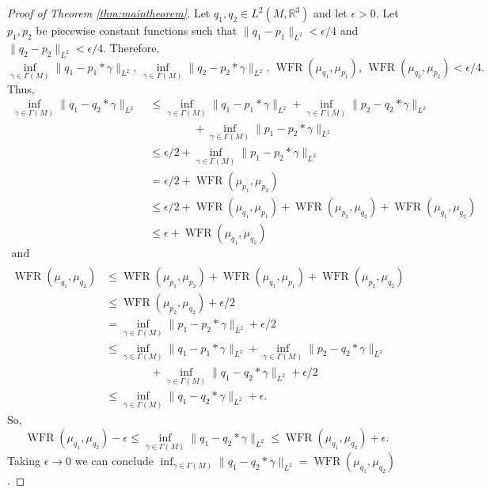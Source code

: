 \documentclass[final,hidelinks,onefignum,onetabnum]{siamart220329}
\newcommand{\R}{\mathbb{R}}
\newcommand{\WFR}{\operatorname{WFR}}
\begin{document}
\begin{proof}[Proof of Theorem \ref{thm:maintheorem}]

Let $q_1,q_2\in L^2(M,\R^3)$ and let $\epsilon>0$. Let $p_1,p_2$ be piecewise constant functions such that $\|q_1-p_1\|_{L^2}<\epsilon/4$ and $\|q_2-p_2\|_{L^2}<\epsilon/4$.  Therefore,   \[\inf_{\gamma\in \Gamma(M)}\|q_1-p_1*\gamma\|_{L^2},\,\inf_{\gamma\in \Gamma(M)}\|q_2-p_2*\gamma\|_{L^2},\,  \WFR(\mu_{q_1},\mu_{p_1}),\,\WFR(\mu_{q_2},\mu_{p_2})<\epsilon/4.\]
Thus,
\begin{align*}
    \inf_{\gamma\in \Gamma(M)}\|q_1-q_2*\gamma\|_{L^2}&\leq \inf_{\gamma\in \Gamma(M)}\|q_1-p_1*\gamma\|_{L^2}+\inf_{\gamma\in \Gamma(M)}\|p_2-q_2*\gamma\|_{L^2}\\
    &\qquad\qquad+\inf_{\gamma\in\Gamma(M)}\|p_1-p_2*\gamma\|_{L^2}\\
    &\leq\epsilon/2+\inf_{\gamma\in\Gamma(M)}\|p_1-p_2*\gamma\|_{L^2}\\
    &=\epsilon/2+\WFR(\mu_{p_1},\mu_{p_2})\\
    &\leq \epsilon/2 + \WFR(\mu_{q_1},\mu_{p_1}) + \WFR(\mu_{p_2},\mu_{q_2})+ \WFR(\mu_{q_1},\mu_{q_2})\\
    &\leq \epsilon + \WFR(\mu_{q_1},\mu_{q_2})\\     
    \text{and}\qquad\qquad\qquad\qquad\qquad\\
\end{align*}
\begin{align*}    \WFR(\mu_{q_1},\mu_{q_2})
    &\leq\WFR(\mu_{p_1},\mu_{p_2})+\WFR(\mu_{q_1},\mu_{p_1})+\WFR(\mu_{p_2},\mu_{q_2})\\
    &\leq\WFR(\mu_{p_2},\mu_{q_2})+\epsilon/2\\
    &=\inf_{\gamma\in\Gamma(M)}\|p_1-p_2*\gamma\|_{L^2}+\epsilon/2\\
    &\leq  \inf_{\gamma\in \Gamma(M)}\|q_1-p_1*\gamma\|_{L^2}+\inf_{\gamma\in \Gamma(M)}\|p_2-q_2*\gamma\|_{L^2}\\
    &\qquad\qquad+\inf_{\gamma\in\Gamma(M)}\|q_1-q_2*\gamma\|_{L^2}+\epsilon/2\\
    &\leq \inf_{\gamma\in\Gamma(M)}\|q_1-q_2*\gamma\|_{L^2}+\epsilon.
\end{align*}
So,\begin{equation*}
    \WFR(\mu_{q_1},\mu_{q_2})-\epsilon\leq \inf_{\gamma\in\Gamma(M)}\|q_1-q_2*\gamma\|_{L^2} \leq \WFR(\mu_{q_1},\mu_{q_2})+\epsilon.
\end{equation*}
Taking $\epsilon\to 0$ we can conclude $\inf_{\gamma\in\Gamma(M)}\|q_1-q_2*\gamma\|_{L^2}=\WFR(\mu_{q_1},\mu_{q_2})$.
\end{proof}
\end{document}
